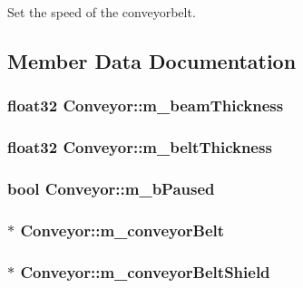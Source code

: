 Set the speed of the conveyorbelt. 



\subsection{Member Data Documentation}
\hypertarget{classConveyor_aa16886f74252de25d3d8972779f282b0}{
\subsubsection[{m\-\_\-beam\-Thickness}]{\setlength{\rightskip}{0pt plus 5cm}float32 Conveyor\-::m\-\_\-beam\-Thickness}}\label{classConveyor_aa16886f74252de25d3d8972779f282b0}
\hypertarget{classConveyor_a38e79e2c88efd24fd626485bff30f697}{
\subsubsection[{m\-\_\-belt\-Thickness}]{\setlength{\rightskip}{0pt plus 5cm}float32 Conveyor\-::m\-\_\-belt\-Thickness}}\label{classConveyor_a38e79e2c88efd24fd626485bff30f697}
\hypertarget{classConveyor_a5cf9db504e884a9542b52037e6e7eb4f}{
\subsubsection[{m\-\_\-b\-Paused}]{\setlength{\rightskip}{0pt plus 5cm}bool Conveyor\-::m\-\_\-b\-Paused}}\label{classConveyor_a5cf9db504e884a9542b52037e6e7eb4f}
\hypertarget{classConveyor_aa1640f4a83793107fcb2af5915b3fba1}{
\subsubsection[{m\-\_\-conveyor\-Belt}]{$\ast$ Conveyor\-::m\-\_\-conveyor\-Belt}}\label{classConveyor_aa1640f4a83793107fcb2af5915b3fba1}
\hypertarget{classConveyor_acb82b369204df0d42ae4483f9e0c9374}{
\subsubsection[{m\-\_\-conveyor\-Belt\-Shield}]{$\ast$ Conveyor\-::m\-\_\-conveyor\-Belt\-Shield}}\label{classConveyor_acb82b369204df0d42ae4483f9e0c9374}
